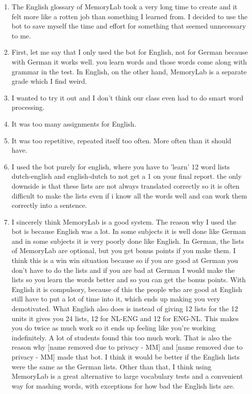 \documentclass[12pt, a4paper]{article}
\begin{document}
{{\begin{enumerate}
    \item The English glossary of MemoryLab took a very long time to create and it felt more like a rotten job than something I learned from. I decided to use the bot to save myself the time and effort for something that seemed unnecessary to me.
    \item First, let me say that I only used the bot for English, not for German because with German it works well. you learn words and those words come along with grammar in the test. In English, on the other hand, MemoryLab is a separate grade which I find weird.
    \item I wanted to try it out and I don't think our class even had to do smart word processing.
    \item It was too many assignments for English.
    \item It was too repetitive, repeated itself too often. More often than it should have.
    \item I used the bot purely for english, where you have to 'learn' 12 word lists dutch-english and english-dutch to not get a 1 on your final report. the only downside is that these lists are not always translated correctly so it is often difficult to make the lists even if i know all the words well and can work them correctly into a sentence.
    \item  I sincerely think MemoryLab is a good system. The reason why I used the bot is because English was a lot. In some subjects it is well done like German and in some subjects it is very poorly done like English. In German, the lists of MemoryLab are optional, but you get bonus points if you make them. I think this is a win win situation because so if you are good at German you don't have to do the lists and if you are bad at German I would make the lists so you learn the words better and so you can get the bonus points. With English it is compulsory, because of this the people who are good at English still have to put a lot of time into it, which ends up making you very demotivated. What English also does is instead of giving 12 lists for the 12 units it gives you 24 lists, 12 for NL-ENG and 12 for ENG-NL. This makes you do twice as much work so it ends up feeling like you're working indefinitely. A lot of students found this too much work. That is also the reason why [name removed due to privacy - MM] and [name removed due to privacy - MM] made that bot. I think it would be better if the English lists were the same as the German lists. Other than that, I think using MemoryLab is a great alternative to large vocabulary tests and a convenient way for mashing words, with exceptions for how bad the English lists are.

\end{enumerate}}}
\end{document}
